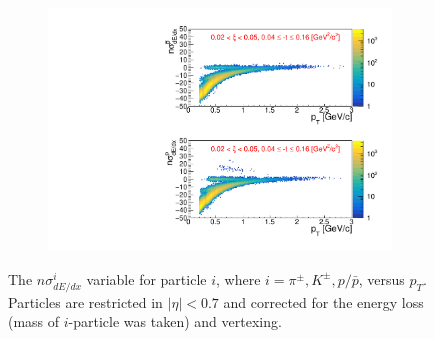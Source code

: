 \begin{figure}[hb]
\begin{subfigure}{.49\textwidth}
	\end{subfigure}
	\begin{subfigure}{.49\textwidth}
		\includegraphics[width=\linewidth, page=1]{chapters/chrgSTAR/img/dEdx/fit2019_2dNsigma_0_2.pdf}
	\end{subfigure}
	\begin{minipage}{.49\textwidth}
		\caption[The $n\sigma^{i}_{dE/dx}$ variable versus $p_T$]{The $n\sigma^{i}_{dE/dx}$ variable for particle $i$, where $i=\pi^\pm, K^\pm, p/\bar{p}$, versus $p_T$. Particles are restricted in $|\eta| < 0.7$ and corrected for the energy loss (mass of $i$-particle was taken) and vertexing.}
		\label{fig:dEdx_nsigma}
	\end{minipage}
	
\end{figure}

